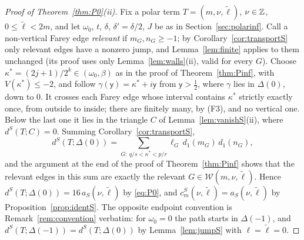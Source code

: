 \begin{proof}[Proof of Theorem~\ref{thm:P0}(ii)]
Fix a polar term $T=(m,\nu,\tilde\ell)$, $\nu\in\mathbb{Z}$, $0\le\tilde\ell<2m$, and let $\omega_0$, $t$, $\delta$, $\delta'=\delta/2$, $J$ be as in Section~\ref{sec:polarinf}. Call a non-vertical Farey edge \emph{relevant} if $m_G,n_G\ge-1$; by Corollary~\ref{cor:transportS} only relevant edges have a nonzero jump, and Lemma~\ref{lem:finite} applies to them unchanged (its proof uses only Lemma~\ref{lem:walls}(ii), valid for every $G$). Choose $\kappa^*=(2j+1)/2^k\in(\omega_0,\beta)$ as in the proof of Theorem~\ref{thm:Pinf}, with $V(\kappa^*)\le-2$, and follow $\gamma(\mathsf y)=\kappa^*+i\mathsf y$ from $\mathsf y>\frac12$, where $\gamma$ lies in $\Delta(0)$, down to $0$. It crosses each Farey edge whose interval contains $\kappa^*$ strictly exactly once, from outside to inside; there are finitely many, by (F3), and no vertical one. Below the last one it lies in the triangle $C$ of Lemma~\ref{lem:vanishS}(ii), where $d^S(T;C)=0$. Summing Corollary~\ref{cor:transportS},
\[
d^S(T;\Delta(0))=\sum_{G:\ q/s<\kappa^*<p/r}\ell_G\,d_1(m_G)\,d_1(n_G),
\]
and the argument at the end of the proof of Theorem~\ref{thm:Pinf} shows that the relevant edges in this sum are exactly the relevant $G\in\mathcal W(m,\nu,\tilde\ell)$. Hence $d^S(T;\Delta(0))=16\,a_S(\nu,\tilde\ell)$ by \eqref{eq:P0}, and $c^S_m(\nu,\tilde\ell)=a_S(\nu,\tilde\ell)$ by Proposition~\ref{prop:identS}. The opposite endpoint convention is Remark~\ref{rem:convention} verbatim: for $\omega_0=0$ the path starts in $\Delta(-1)$, and $d^S(T;\Delta(-1))=d^S(T;\Delta(0))$ by Lemma~\ref{lem:jumpS} with $\ell=\tilde\ell=0$.
\end{proof}

